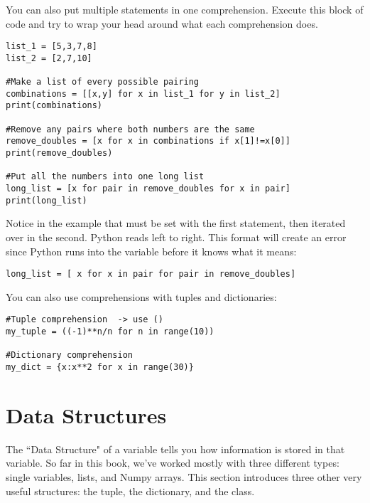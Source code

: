 You can also put multiple  statements in one comprehension.  Execute this block of code and try to wrap your head around what each comprehension does.
\begin{Verbatim}
list_1 = [5,3,7,8]
list_2 = [2,7,10]

#Make a list of every possible pairing
combinations = [[x,y] for x in list_1 for y in list_2]
print(combinations)

#Remove any pairs where both numbers are the same
remove_doubles = [x for x in combinations if x[1]!=x[0]]
print(remove_doubles)

#Put all the numbers into one long list
long_list = [x for pair in remove_doubles for x in pair]
print(long_list)
\end{Verbatim}
Notice in the  example that  must be set with the first  statement, then iterated over in the second. Python reads left to right.  This format will create an error since Python runs into the variable  before it knows what it means:
\begin{Verbatim}
long_list = [ x for x in pair for pair in remove_doubles]
\end{Verbatim}


You can also use comprehensions with tuples and dictionaries:
\begin{Verbatim}
#Tuple comprehension  -> use ()
my_tuple = ((-1)**n/n for n in range(10))

#Dictionary comprehension
my_dict = {x:x**2 for x in range(30)}
\end{Verbatim}




\section{Data Structures}\label{sec:datastruct}
The ``Data Structure" of a variable tells you how information is stored in that variable.  So far in this book, we've worked mostly with three different types: single variables, lists, and Numpy arrays. This section introduces three other very useful structures: the tuple, the dictionary, and the class.

